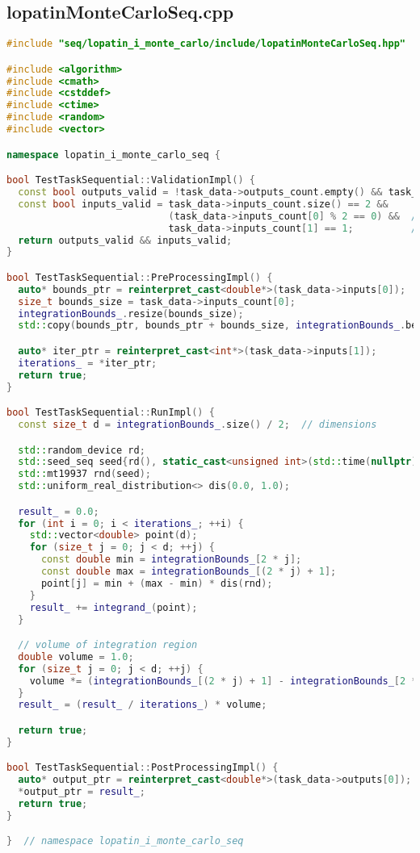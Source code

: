 \documentclass[12pt,a4paper]{extarticle}
\begin{document}
\subsection{lopatinMonteCarloSeq.cpp}
\begin{lstlisting}[language=C++]
#include "seq/lopatin_i_monte_carlo/include/lopatinMonteCarloSeq.hpp"

#include <algorithm>
#include <cmath>
#include <cstddef>
#include <ctime>
#include <random>
#include <vector>

namespace lopatin_i_monte_carlo_seq {

bool TestTaskSequential::ValidationImpl() {
  const bool outputs_valid = !task_data->outputs_count.empty() && task_data->outputs_count[0] == 1;
  const bool inputs_valid = task_data->inputs_count.size() == 2 &&
                            (task_data->inputs_count[0] % 2 == 0) &&  // odd num of bounds
                            task_data->inputs_count[1] == 1;          // iterations num
  return outputs_valid && inputs_valid;
}

bool TestTaskSequential::PreProcessingImpl() {
  auto* bounds_ptr = reinterpret_cast<double*>(task_data->inputs[0]);
  size_t bounds_size = task_data->inputs_count[0];
  integrationBounds_.resize(bounds_size);
  std::copy(bounds_ptr, bounds_ptr + bounds_size, integrationBounds_.begin());

  auto* iter_ptr = reinterpret_cast<int*>(task_data->inputs[1]);
  iterations_ = *iter_ptr;
  return true;
}

bool TestTaskSequential::RunImpl() {
  const size_t d = integrationBounds_.size() / 2;  // dimensions

  std::random_device rd;
  std::seed_seq seed{rd(), static_cast<unsigned int>(std::time(nullptr))};
  std::mt19937 rnd(seed);
  std::uniform_real_distribution<> dis(0.0, 1.0);

  result_ = 0.0;
  for (int i = 0; i < iterations_; ++i) {
    std::vector<double> point(d);
    for (size_t j = 0; j < d; ++j) {
      const double min = integrationBounds_[2 * j];
      const double max = integrationBounds_[(2 * j) + 1];
      point[j] = min + (max - min) * dis(rnd);
    }
    result_ += integrand_(point);
  }

  // volume of integration region
  double volume = 1.0;
  for (size_t j = 0; j < d; ++j) {
    volume *= (integrationBounds_[(2 * j) + 1] - integrationBounds_[2 * j]);
  }
  result_ = (result_ / iterations_) * volume;

  return true;
}

bool TestTaskSequential::PostProcessingImpl() {
  auto* output_ptr = reinterpret_cast<double*>(task_data->outputs[0]);
  *output_ptr = result_;
  return true;
}

}  // namespace lopatin_i_monte_carlo_seq

\end{lstlisting}
\end{document}
